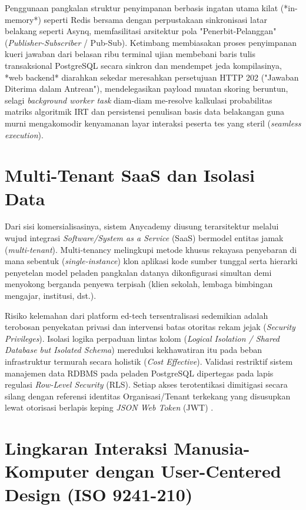 Penggunaan pangkalan struktur penyimpanan berbasis ingatan utama kilat (*in-memory*) seperti Redis bersama dengan perpustakaan sinkronisasi latar belakang seperti Asynq, memfasilitasi arsitektur pola "Penerbit-Pelanggan" (\textit{Publisher-Subscriber} / Pub-Sub). Ketimbang membiasakan proses penyimpanan kueri jawaban dari belasan ribu terminal ujian membebani baris tulis transaksional PostgreSQL secara sinkron dan mendempet jeda kompilasinya, *web backend* diarahkan sekedar meresahkan persetujuan HTTP 202 ("Jawaban Diterima dalam Antrean"), mendelegasikan payload muatan skoring beruntun, selagi \textit{background worker task} diam-diam me-resolve kalkulasi probabilitas matriks algoritmik IRT dan persistensi penulisan basis data belakangan guna murni mengakomodir kenyamanan layar interaksi peserta tes yang steril (\textit{seamless execution}).

\section{Multi-Tenant SaaS dan Isolasi Data}

Dari sisi komersialisasinya, sistem Anycademy diusung terarsitektur melalui wujud integrasi \textit{Software/System as a Service} (SaaS) bermodel entitas jamak (\textit{multi-tenant}). Multi-tenancy melingkupi metode khusus rekayasa penyebaran di mana sebentuk (\textit{single-instance}) klon aplikasi kode sumber tunggal serta hierarki penyetelan model peladen pangkalan datanya dikonfigurasi simultan demi menyokong berganda penyewa terpisah (klien sekolah, lembaga bimbingan mengajar, institusi, dst.).

Risiko kelemahan dari platform ed-tech tersentralisasi sedemikian adalah terobosan penyekatan privasi dan intervensi batas otoritas rekam jejak (\textit{Security Privileges}). Isolasi logika perpaduan lintas kolom (\textit{Logical Isolation / Shared Database but Isolated Schema}) mereduksi kekhawatiran itu pada beban infrastruktur termurah secara holistik (\textit{Cost Effective}). Validasi restriktif sistem manajemen data RDBMS pada peladen PostgreSQL dipertegas pada lapis regulasi \textit{Row-Level Security} (RLS). Setiap akses terotentikasi dimitigasi secara silang dengan referensi identitas Organisasi/Tenant terkekang yang disusupkan lewat otorisasi berlapis keping \textit{JSON Web Token} (JWT) \citep{Khan2013}.

\section{Lingkaran Interaksi Manusia-Komputer dengan User-Centered Design (ISO 9241-210)}

